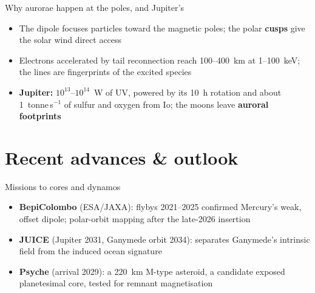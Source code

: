 \documentclass[aspectratio=169, 11pt]{beamer}
\begin{document}
\begin{frame}{Why aurorae happen at the poles, and Jupiter's}
  \begin{itemize}\setlength\itemsep{4pt}
    \item The dipole focuses particles toward the magnetic poles; the polar \textbf{cusps} give the solar wind direct access
    \item Electrons accelerated by tail reconnection reach 100--400~km at 1--100~keV; the lines are fingerprints of the excited species
    \item \textbf{Jupiter:} $10^{13}$--$10^{14}$~W of UV, powered by its 10~h rotation and about 1~tonne\,s$^{-1}$ of sulfur and oxygen from Io; the moons leave \textbf{auroral footprints}
  \end{itemize}
  \vskip8pt
\end{frame}

\begin{frame}
\end{frame}

\section{Recent advances \& outlook}

\begin{frame}
\end{frame}

\begin{frame}{Missions to cores and dynamos}
  \begin{itemize}\setlength\itemsep{4pt}
    \item \textbf{BepiColombo} (ESA/JAXA): flybys 2021--2025 confirmed Mercury's weak, offset dipole; polar-orbit mapping after the late-2026 insertion
    \item \textbf{JUICE} (Jupiter 2031, Ganymede orbit 2034): separates Ganymede's intrinsic field from the induced ocean signature
    \item \textbf{Psyche} (arrival 2029): a 220~km M-type asteroid, a candidate exposed planetesimal core, tested for remnant magnetisation
  \end{itemize}
  \vskip8pt
\end{frame}
\end{document}
